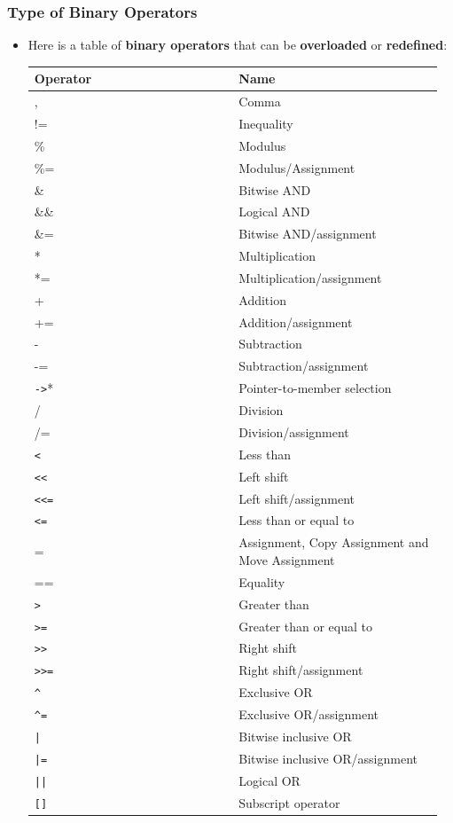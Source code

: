\documentclass[10pt]{article}
\begin{document}
\subsubsection{Type of Binary Operators}
\begin{itemize}
	\item Here is a table of \textbf{binary operators} that can be \textbf{overloaded} or \textbf{redefined}:

		\begin{tabular}{p{0.48\linewidth} p{0.48\linewidth}}
			\hline
			Operator & Name\\
			\hline
			, & Comma \\ 
			!=	&	Inequality \\
			\%	&	Modulus\\
			\%=	&	Modulus/Assignment\\
			\&	&	Bitwise AND\\
			\&\&	&	Logical AND\\
			\&=	&	Bitwise AND/assignment\\
			*	&	Multiplication\\
			*=	&	Multiplication/assignment\\
			+	&	Addition\\
			+=	&	Addition/assignment\\
			-	&	Subtraction\\
			-=	&	Subtraction/assignment\\
			\verb|->|*	&	Pointer-to-member selection\\
			/	&	Division\\
			/=	&	Division/assignment\\
			\verb|<|	& Less than\\
			\verb|<<|	& Left shift\\
			\verb|<<=|	& Left shift/assignment\\
			\verb|<=|	& Less than or equal to\\ 
			=	&	Assignment, Copy Assignment and Move Assignment\\
			==	&	Equality\\
			\verb|>|	& Greater than\\
			\verb|>=|	& Greater than or equal to\\ 
			\verb|>>|	& Right shift\\
			\verb|>>=|	& Right shift/assignment\\
			\verb|^|	&	Exclusive OR\\
			\verb|^=|	&	Exclusive OR/assignment\\
			\verb+|+      & Bitwise inclusive OR \\
			\verb+|=+     & Bitwise inclusive OR/assignment \\
			\verb+||+     & Logical OR \\
			\verb|[]|	&	Subscript operator\\
			\hline
		\end{tabular}
\end{itemize}
\end{document}

